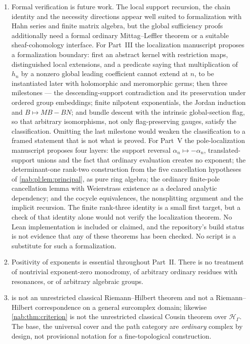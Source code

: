 \documentclass[11pt,letterpaper]{article}
\theoremstyle{definition}
\theoremstyle{remark}
\newcommand{\HH}{\mathscr H_\Gamma}
\numberwithin{equation}{section}
\begin{document}
\begin{enumerate}
\item\label{nab:nc:formal}
Formal verification is future work. The local support recursion, the chain
identity and the necessity directions appear well suited to formalization
with Hahn series and finite matrix algebra, but the global sufficiency proofs
additionally need a formal ordinary Mittag--Leffler theorem or a suitable
sheaf-cohomology interface. For Part~III the localization manuscript proposes
a formalization boundary: first an abstract kernel with restriction maps,
distinguished local extensions, and a predicate saying that multiplication of
$h_n$ by a nonzero global leading coefficient cannot extend at $n$, to be
instantiated later with holomorphic and meromorphic germs; then three
milestones --- the descending-support contradiction and its preservation under
ordered group embeddings; finite nilpotent exponentials, the Jordan induction
and $B\mapsto MB-BN$; and bundle descent with the intrinsic global-section flag,
so that arbitrary isomorphisms, not only flag-preserving gauges, satisfy the
classification. Omitting the last milestone would weaken the classification to
a framed statement that is not what is proved. For Part~V
the pole-localization manuscript proposes four layers: the support reversal
$\alpha_n\mapsto-\alpha_n$, translated-support unions and the fact that
ordinary evaluation creates no exponent; the determinant-one rank-two
construction from the five cancellation hypotheses of
\cref{nab:pl:lem:principal}, as pure ring algebra; the ordinary finite-pole
cancellation lemma with Weierstrass existence as a declared analytic
dependency; and the cocycle equivalences, the nonsplitting argument and the
implicit recursion. The finite rank-three identity is a small first target, but
a check of that identity alone would not verify the localization theorem. No Lean implementation is
included or claimed, and the repository's build status is not evidence that
any of these theorems has been checked. No script is a substitute for such a
formalization.

\item\label{nab:nc:positivity}
Positivity of exponents is essential throughout Part~II. There is no treatment
of nontrivial exponent-zero monodromy, of arbitrary ordinary residues with
resonances, or of arbitrary algebraic groups.

\item\label{nab:nc:notclassical}
 is not an unrestricted classical Riemann--Hilbert theorem and
not a Riemann--Hilbert correspondence on a general surcomplex domain; likewise
\cref{nab:thm:criterion} is not the unrestricted classical Cousin theorem over
$\HH$. The base, the universal cover and the path category are \emph{ordinary}
complex by design, not provisional notation for a fine-topological
construction.


\end{enumerate}
\end{document}
